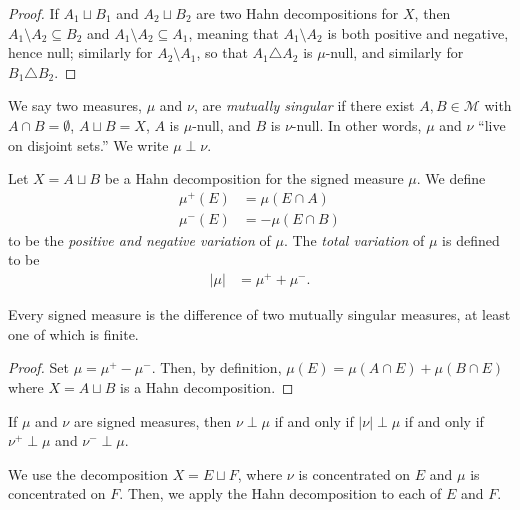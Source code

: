 \documentclass[10pt]{mypackage}
\begin{document}
\begin{proof}
  If $A_1\sqcup B_1$ and $A_2\sqcup B_2$ are two Hahn decompositions for $X$, then $A_1\setminus A_2 \subseteq B_2$ and $A_1\setminus A_2 \subseteq A_1$, meaning that $A_1\setminus A_2$ is both positive and negative, hence null; similarly for $A_2\setminus A_1$, so that $A_1\triangle A_2$ is $\mu$-null, and similarly for $B_1\triangle B_2$.
\end{proof}
\begin{definition}
  We say two measures, $\mu$ and $\nu$, are \textit{mutually singular} if there exist $A,B\in \mathcal{M}$ with $A\cap B = \emptyset$, $A\sqcup B = X$, $A$ is $\mu$-null, and $B$ is $\nu$-null. In other words, $\mu$ and $\nu$ ``live on disjoint sets.'' We write $\mu\perp \nu$.
\end{definition}
\begin{definition}
  Let $X = A\sqcup B$ be a Hahn decomposition for the signed measure $\mu$. We define
  \begin{align*}
    \mu^{+}\left( E \right) &= \mu\left( E\cap A \right)\\
    \mu^{-}\left( E \right) &= -\mu\left( E\cap B \right)
  \end{align*}
  to be the \textit{positive and negative variation} of $\mu$. The \textit{total variation} of $\mu$ is defined to be
  \begin{align*}
    \left\vert \mu \right\vert &= \mu^{+} + \mu^{-}.
  \end{align*}
\end{definition}
\begin{theorem}
  Every signed measure is the difference of two mutually singular measures, at least one of which is finite.
\end{theorem}
\begin{proof}
  Set $\mu = \mu^{+}-\mu^{-}$. Then, by definition, $\mu\left( E \right) = \mu\left( A\cap E \right) + \mu\left( B\cap E \right)$ where $X = A\sqcup B$ is a Hahn decomposition.
\end{proof}
\begin{exercise}
  If $\mu$ and $\nu$ are signed measures, then $\nu\perp \mu$ if and only if $\left\vert \nu \right\vert\perp \mu$ if and only if $\nu^{+}\perp \mu$ and $\nu^{-}\perp \mu$.
\end{exercise}
\begin{solution}
  We use the decomposition $X = E\sqcup F$, where $\nu$ is concentrated on $E$ and $\mu$ is concentrated on $F$. Then, we apply the Hahn decomposition to each of $E$ and $F$.
\end{solution}
\end{document}
